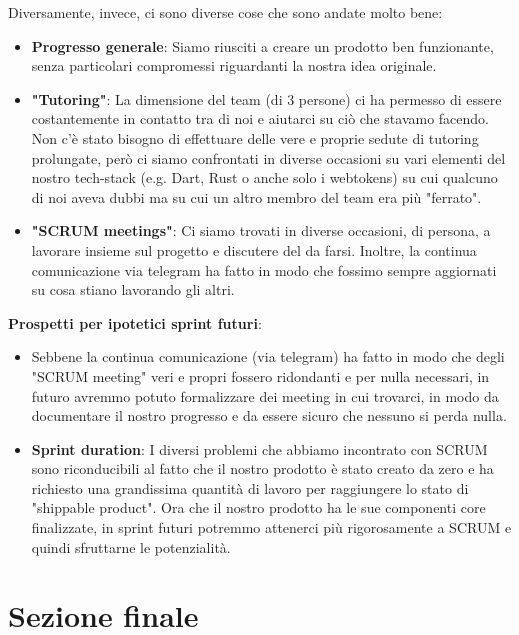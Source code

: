 \documentclass{article}
\begin{document}
Diversamente, invece, ci sono diverse cose che sono andate molto bene:
\begin{itemize}
    \item \textbf{Progresso generale}: Siamo riusciti a creare un prodotto ben funzionante, senza particolari compromessi riguardanti la nostra idea originale. 
    \item \textbf{"Tutoring"}: La dimensione del team (di 3 persone) ci ha permesso di essere costantemente in contatto tra di noi e aiutarci su ciò che stavamo facendo. Non c'è stato bisogno di effettuare delle vere e proprie sedute di tutoring prolungate, però ci siamo confrontati in diverse occasioni su vari elementi del nostro tech-stack (e.g. Dart, Rust o anche solo i webtokens) su cui qualcuno di noi aveva dubbi ma su cui un altro membro del team era più "ferrato".
    \item \textbf{"SCRUM meetings"}: Ci siamo trovati in diverse occasioni, di persona, a lavorare insieme sul progetto e discutere del da farsi. Inoltre, la continua comunicazione via telegram ha fatto in modo che fossimo sempre aggiornati su cosa stiano lavorando gli altri.
\end{itemize}

\textbf{Prospetti per ipotetici sprint futuri}:
\begin{itemize}
    \item Sebbene la continua comunicazione (via telegram) ha fatto in modo che degli "SCRUM meeting" veri e propri fossero ridondanti e per nulla necessari, in futuro avremmo potuto formalizzare dei meeting in cui trovarci, in modo da documentare il nostro progresso e da essere sicuro che nessuno si perda nulla. 
    \item \textbf{Sprint duration}: I diversi problemi che abbiamo incontrato con SCRUM sono riconducibili al fatto che il nostro prodotto è stato creato da zero e ha richiesto una grandissima quantità di lavoro per raggiungere lo stato di "shippable product". Ora che il nostro prodotto ha le sue componenti core finalizzate, in sprint futuri potremmo attenerci più rigorosamente a SCRUM e quindi sfruttarne le potenzialità. 
\end{itemize}

\clearpage

\section{Sezione finale}
\end{document}
